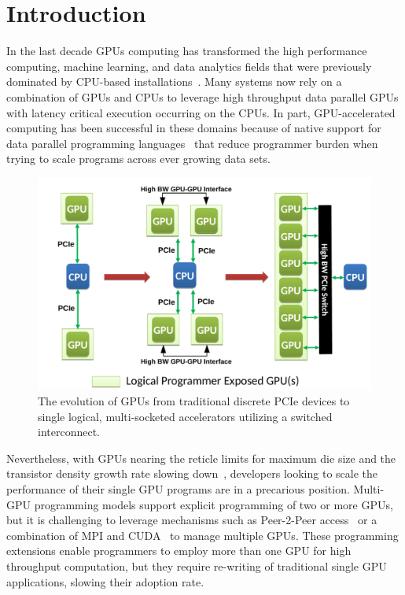 \vspace{-0.1in}
\section{Introduction}
\label{introduction}

In the last decade GPUs computing has transformed the high performance 
computing, machine learning, and data analytics fields that were previously 
dominated by CPU-based 
installations~\cite{intersect360,cudnn,Lavin15b,SimonyanZ14a}. Many systems now 
rely on a combination of GPUs and CPUs to leverage high throughput data parallel 
GPUs with latency critical execution occurring on the CPUs. In part, 
GPU-accelerated computing has been successful in these domains because of native 
support for data parallel programming languages~\cite{CUDA7,OPENCL} that reduce 
programmer burden when trying to scale programs across ever growing data sets.

\begin{figure}[t]
\centering
\includegraphics[width=1.0\columnwidth]{figures/inter_gpu_connections.pdf}
\caption{The evolution of GPUs from traditional discrete PCIe devices to 
single logical, multi-socketed accelerators utilizing a switched interconnect.}
\label{fig:systemdiagram}
\vspace{-.2in}
\end{figure}

Nevertheless, with GPUs nearing the reticle limits for maximum die size and 
the transistor density growth rate slowing down~\cite{mooredead2016}, developers 
looking to scale the performance of their single GPU programs are in a 
precarious position. Multi-GPU programming models support explicit programming 
of two or more GPUs, but it is challenging to leverage mechanisms such as 
Peer-2-Peer access~\cite{NVIDIAP2P} or a combination of MPI and 
CUDA~\cite{NVIDIAMPI} to manage multiple GPUs. These programming extensions 
enable programmers to employ more than one GPU for high throughput computation, 
but they require re-writing of traditional single GPU applications,
slowing their adoption rate.

